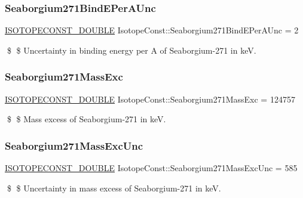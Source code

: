 \subsubsection{\texorpdfstring{Seaborgium271\+Bind\+E\+Per\+A\+Unc}{Seaborgium271BindEPerAUnc}}
{\footnotesize\ttfamily \mbox{\hyperlink{group___isotope_const-_macros_ga8f45a7272ce02c0b4c65c44636ed719a}{I\+S\+O\+T\+O\+P\+E\+C\+O\+N\+S\+T\+\_\+\+D\+O\+U\+B\+LE}} Isotope\+Const\+::\+Seaborgium271\+Bind\+E\+Per\+A\+Unc = 2}

\$ \$ Uncertainty in binding energy per A of Seaborgium-\/271 in keV. \mbox{\label{group___isotope_const-_seaborgium-_sg271_ga649d837ff53d80b4ddcbadc32648545e}} 
\subsubsection{\texorpdfstring{Seaborgium271\+Mass\+Exc}{Seaborgium271MassExc}}
{\footnotesize\ttfamily \mbox{\hyperlink{group___isotope_const-_macros_ga8f45a7272ce02c0b4c65c44636ed719a}{I\+S\+O\+T\+O\+P\+E\+C\+O\+N\+S\+T\+\_\+\+D\+O\+U\+B\+LE}} Isotope\+Const\+::\+Seaborgium271\+Mass\+Exc = 124757}

\$ \$ Mass excess of Seaborgium-\/271 in keV. \mbox{\label{group___isotope_const-_seaborgium-_sg271_gad9a4467d45ef77e7c4aa2c60959d92bb}} 
\subsubsection{\texorpdfstring{Seaborgium271\+Mass\+Exc\+Unc}{Seaborgium271MassExcUnc}}
{\footnotesize\ttfamily \mbox{\hyperlink{group___isotope_const-_macros_ga8f45a7272ce02c0b4c65c44636ed719a}{I\+S\+O\+T\+O\+P\+E\+C\+O\+N\+S\+T\+\_\+\+D\+O\+U\+B\+LE}} Isotope\+Const\+::\+Seaborgium271\+Mass\+Exc\+Unc = 585}

\$ \$ Uncertainty in mass excess of Seaborgium-\/271 in keV. \mbox{\label{group___isotope_const-_seaborgium-_sg271_gaf5b1620f6ac99d0a13d4777b661a83bd}} 
